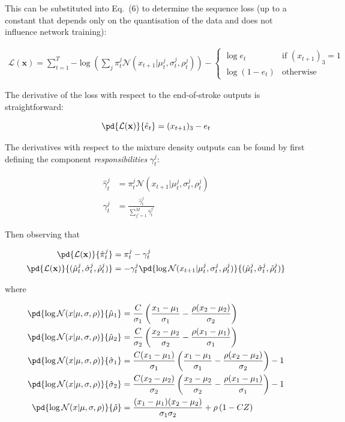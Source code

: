 This can be substituted into Eq.~(6) to determine the sequence loss (up to a constant that depends only on the quantisation of the data and does not influence network training):

\begin{align}
\mathcal{L}(\mathbf{x}) = \sum_{t=1}^{T}{-\log \left(\sum_j{\pi^j_t \mathcal{N}(x_{t+1}|\mu_t^j, \sigma_t^j, \rho_t^j )}\right)} - \begin{cases}\log e_t  &\text{if } (x_{t+1})_3 = 1\\\log(1-e_t) &\text{otherwise}\end{cases}
\end{align}

The derivative of the loss with respect to the end-of-stroke outputs is straightforward:

\begin{equation}
\label{eq:eos_deriv}
\pd{\mathcal{L}(\mathbf{x})}{\hat{e}_t} = (x_{t+1})_3 - e_t
\end{equation}

The derivatives with respect to the mixture density outputs can be found by first defining the component \emph{responsibilities} $\gamma^j_t$:

\begin{align}
\hat{\gamma}^j_t &= \pi^j_t \mathcal{N}(x_{t+1}|\mu_t^j, \sigma_t^j, \rho_t^j )\\
\gamma^j_t &= \frac{\hat{\gamma}^j_t}{\sum_{j'=1}^M{\hat{\gamma}^{j'}_t}}
\end{align}

Then observing that

\begin{align}
\label{eq:mix_wt_deriv}
\pd{\mathcal{L}(\mathbf{x})}{\hat{\pi}^j_t} &= \pi^j_t -\gamma^j_t\\
\label{eq:component_derivs}
\pd{\mathcal{L}(\mathbf{x})}{(\hat{\mu}^j_t,\hat{\sigma}^j_t,\hat{\rho}^j_t)} &= -\gamma^j_t \pd{\log \mathcal{N}(x_{t+1}|\mu_t^j, \sigma_t^j, \rho_t^j )}{(\hat{\mu}^j_t,\hat{\sigma}^j_t,\hat{\rho}^j_t)}
\end{align}

where

\begin{align}
\pd{\log \mathcal{N}(x|\mu, \sigma, \rho)}{\hat{\mu}_1} &= \frac{C}{\sigma_1} \left(\frac{x_1-\mu_1}{\sigma_1} - \frac{\rho(x_2-\mu_2)}{\sigma_2} \right)\\ 
\pd{\log \mathcal{N}(x|\mu, \sigma, \rho)}{\hat{\mu}_2} &= \frac{C}{\sigma_2} \left(\frac{x_2-\mu_2}{\sigma_2} - \frac{\rho(x_1-\mu_1)}{\sigma_1} \right)\\ 
\pd{\log \mathcal{N}(x|\mu, \sigma, \rho)}{\hat{\sigma}_1} &= \frac{C(x_1-\mu_1)}{\sigma_1} \left(\frac{x_1-\mu_1}{\sigma_1} - \frac{\rho(x_2-\mu_2)}{\sigma_2}\right) - 1\\ 
\pd{\log \mathcal{N}(x|\mu, \sigma, \rho)}{\hat{\sigma}_2} &= \frac{C(x_2-\mu_2)}{\sigma_2} \left(\frac{x_2-\mu_2}{\sigma_2} - \frac{\rho(x_1-\mu_1)}{\sigma_1}\right) - 1\\ 
\pd{\log \mathcal{N}(x|\mu, \sigma, \rho)}{\hat{\rho}} &= \frac{(x_1-\mu_1)(x_2-\mu_2)}{\sigma_1 \sigma_2} + \rho\left(1 - C Z\right) 
\end{align}

